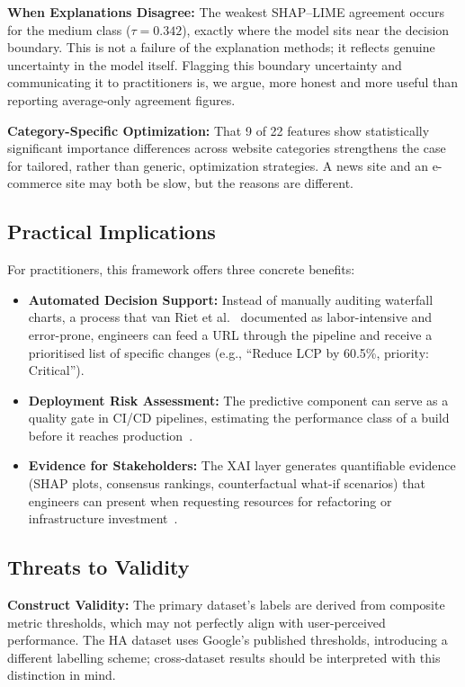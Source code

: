 \documentclass[sn-nature]{sn-jnl}
\begin{document}
\textbf{When Explanations Disagree:} The weakest SHAP--LIME agreement occurs for the medium class ($\tau = 0.342$), exactly where the model sits near the decision boundary. This is not a failure of the explanation methods; it reflects genuine uncertainty in the model itself. Flagging this boundary uncertainty and communicating it to practitioners is, we argue, more honest and more useful than reporting average-only agreement figures.

\textbf{Category-Specific Optimization:} That 9 of 22 features show statistically significant importance differences across website categories strengthens the case for tailored, rather than generic, optimization strategies. A news site and an e-commerce site may both be slow, but the reasons are different.

\subsection{Practical Implications}

For practitioners, this framework offers three concrete benefits:

\begin{itemize}
    \item \textbf{Automated Decision Support:} Instead of manually auditing waterfall charts, a process that van Riet et al.~\cite{vanriet2023} documented as labor-intensive and error-prone, engineers can feed a URL through the pipeline and receive a prioritised list of specific changes (e.g., ``Reduce LCP by 60.5\%, priority: Critical'').

    \item \textbf{Deployment Risk Assessment:} The predictive component can serve as a quality gate in CI/CD pipelines, estimating the performance class of a build before it reaches production~\cite{dakic2025}.

    \item \textbf{Evidence for Stakeholders:} The XAI layer generates quantifiable evidence (SHAP plots, consensus rankings, counterfactual what-if scenarios) that engineers can present when requesting resources for refactoring or infrastructure investment~\cite{hassija2024}.
\end{itemize}

\subsection{Threats to Validity}

\textbf{Construct Validity:} The primary dataset's labels are derived from composite metric thresholds, which may not perfectly align with user-perceived performance. The HA dataset uses Google's published thresholds, introducing a different labelling scheme; cross-dataset results should be interpreted with this distinction in mind.
\end{document}
